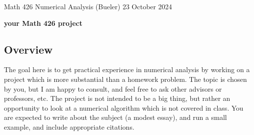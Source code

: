 \documentclass[11pt]{amsart}
\begin{document}
\scriptsize \noindent Math 426 Numerical Analysis (Bueler) \hfill 23 October 2024
\bigskip

\Large\centerline{\textbf{your Math 426 project}}
\normalsize

\thispagestyle{empty}

\bigskip

\subsection*{Overview}  The goal here is to get practical experience in numerical analysis by working on a project which is more substantial than a homework problem.  The topic is chosen by you, but I am happy to consult, and feel free to ask other advisors or professors, etc.  The project is not intended to be a big thing, but rather an opportunity to look at a numerical algorithm which is not covered in class.  You are expected to write about the subject (a modest essay), and run a small example, and include appropriate citations.
\end{document}
